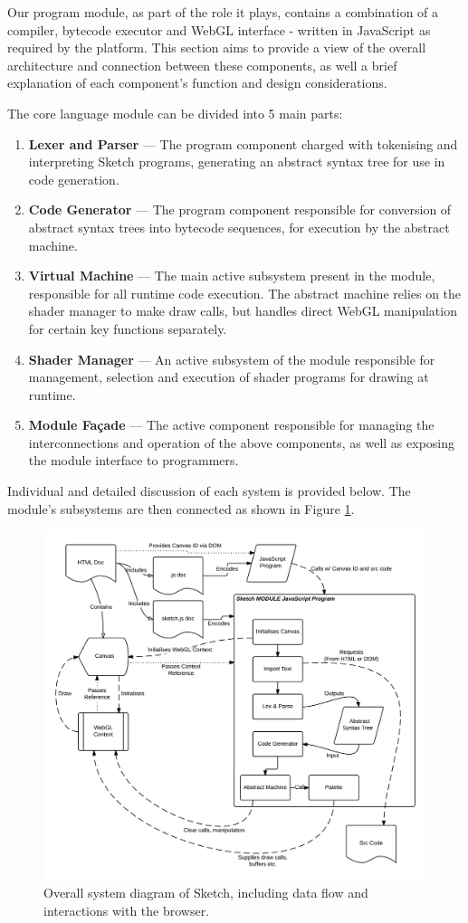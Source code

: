 \documentclass{l3proj}
\begin{document}
Our program module, as part of the role it plays, contains a combination of a compiler, bytecode executor and WebGL interface - written in JavaScript as required by the platform. This section aims to provide a view of the overall architecture and connection between these components, as well a brief explanation of each component's function and design considerations.

The core language module can be divided into 5 main parts:
\begin{enumerate}
\item \textbf{Lexer and Parser} --- The program component charged with tokenising and interpreting Sketch programs, generating an abstract syntax tree for use in code generation.
\item \textbf{Code Generator} --- The program component responsible for conversion of abstract syntax trees into bytecode sequences, for execution by the abstract machine.
\item \textbf{Virtual Machine} --- The main active subsystem present in the module, responsible for all runtime code execution. The abstract machine relies on the shader manager to make draw calls, but handles direct WebGL manipulation for certain key functions separately.
\item \textbf{Shader Manager} --- An active subsystem of the module responsible for management, selection and execution of shader programs for drawing at runtime.
\item \textbf{Module Fa\c{c}ade} --- The active component responsible for managing the interconnections and operation of the above components, as well as exposing the module interface to programmers.
\end{enumerate}
Individual and detailed discussion of each system is provided below. The module's subsystems are then connected as shown in Figure \ref{fig:sketch-overall}.
\begin{figure}[!h]
\centering
\includegraphics[width=\textwidth]{images/sys-diag}
\caption{Overall system diagram of Sketch, including data flow and interactions with the browser.}
\label{fig:sketch-overall}
\end{figure}
\end{document}
